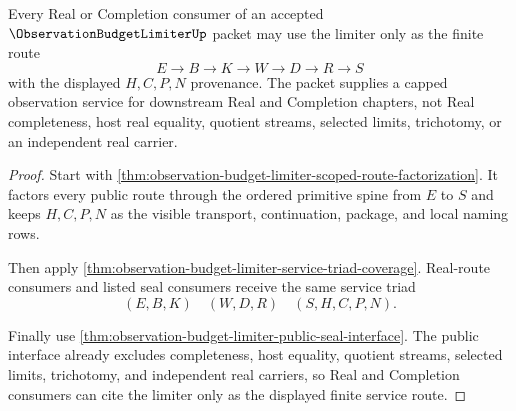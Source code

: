 \begin{theorem}
\label{thm:observation-budget-limiter-real-completion-consumer-boundary}
Every Real or Completion consumer of an accepted $\ObservationBudgetLimiterUp$ packet may use the limiter only as the finite route
$$
E \to B \to K \to W \to D \to R \to S
$$
with the displayed $H,C,P,N$ provenance. The packet supplies a capped observation service for downstream Real and Completion chapters, not Real completeness, host real equality, quotient streams, selected limits, trichotomy, or an independent real carrier.
\end{theorem}
\begin{proof}
Start with \autoref{thm:observation-budget-limiter-scoped-route-factorization}. It factors every public route through the ordered primitive spine from $E$ to $S$ and keeps $H,C,P,N$ as the visible transport, continuation, package, and local naming rows.

Then apply \autoref{thm:observation-budget-limiter-service-triad-coverage}. Real-route consumers and listed seal consumers receive the same service triad
$$
(E,B,K) \quad (W,D,R) \quad (S,H,C,P,N).
$$

Finally use \autoref{thm:observation-budget-limiter-public-seal-interface}. The public interface already excludes completeness, host equality, quotient streams, selected limits, trichotomy, and independent real carriers, so Real and Completion consumers can cite the limiter only as the displayed finite service route.
\end{proof}

